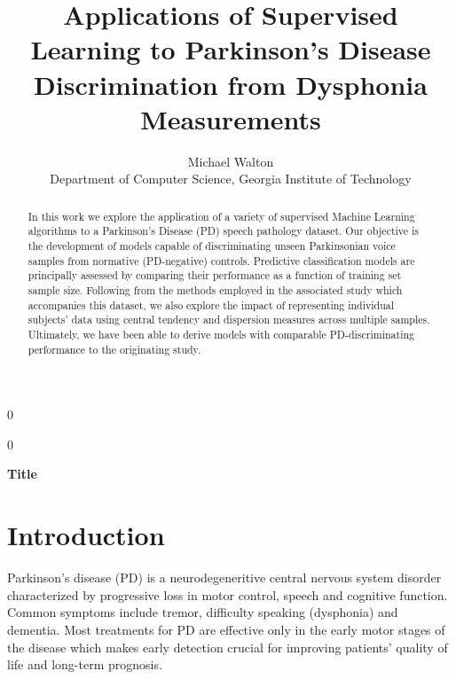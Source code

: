 \documentclass[12pt]{article}
\newcommand{\blind}{0}
\begin{document}
%

\def\spacingset#1{\renewcommand{\baselinestretch}%
{#1}\small\normalsize} \spacingset{1}



\blind
{
  \title{\bf Applications of Supervised Learning to Parkinson's Disease Discrimination from Dysphonia Measurements}
  \author{Michael Walton\\
    Department of Computer Science, Georgia Institute of Technology\\}
  \maketitle
} \fi

\blind
{
  \bigskip
  \bigskip
  \bigskip
  \begin{center}
    {\LARGE\bf Title}
\end{center}
  \medskip
} \fi

\bigskip
\begin{abstract}
In this work we explore the application of a variety of supervised Machine Learning algorithms to a Parkinson's Disease (PD) speech pathology dataset. Our objective is the development of models capable of discriminating unseen Parkinsonian voice samples from normative (PD-negative) controls. Predictive classification models are principally assessed by comparing their performance as a function of training set sample size. Following from the methods employed in the associated study which accompanies this dataset, we also explore the impact of representing individual subjects' data using central tendency and dispersion measures across multiple samples. Ultimately, we have been able to derive models with comparable PD-discriminating performance to the originating study.
\end{abstract}

\spacingset{1.45}
\section{Introduction}
\label{sec:intro}

Parkinson's disease (PD) is a neurodegeneritive central nervous system disorder characterized by progressive loss in motor control, speech and cognitive function. Common symptoms include tremor, difficulty speaking (dysphonia) and dementia. Most treatments for PD are effective only in the early motor stages of the disease which makes early detection crucial for improving patients' quality of life and long-term prognosis.
\end{document}
